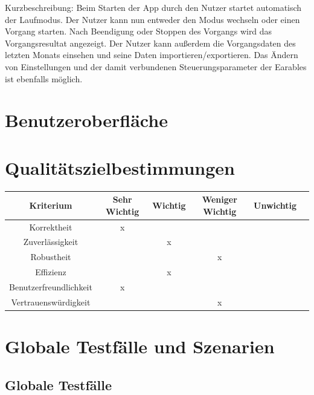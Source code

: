 \documentclass[a4paper,12pt]{article}
\begin{document}
Kurzbeschreibung: Beim Starten der App durch den Nutzer startet automatisch der Laufmodus. Der Nutzer kann nun entweder den Modus wechseln oder einen Vorgang starten. Nach Beendigung oder Stoppen des Vorgangs wird das Vorgangsresultat angezeigt. Der Nutzer kann außerdem die Vorgangsdaten des letzten Monats einsehen und seine Daten importieren/exportieren. Das Ändern von Einstellungen und der damit verbundenen Steuerungsparameter der Earables ist ebenfalls möglich.
\section{Benutzeroberfläche}
\section{Qualitätszielbestimmungen}
\begin{tabular}[t]{|c|c|c|c|c|c|}
  \hline
  \textbf{Kriterium} & \textbf{Sehr Wichtig} & \textbf{Wichtig} & \textbf{Weniger Wichtig} & \textbf{Unwichtig}\\
  \hline
  \hline
  Korrektheit & x & & &\\ %
  \hline
  Zuverlässigkeit & & x & &\\ %
  \hline
  Robustheit & & & x &\\  %
  \hline
  Effizienz & & x & &\\ %
  \hline
  Benutzerfreundlichkeit & x & & &\\ %
  \hline
  Vertrauenswürdigkeit & & & x &\\ %
  \hline

\end{tabular}

\section{Globale Testfälle und Szenarien}
  \subsection{Globale Testfälle}
\end{document}
